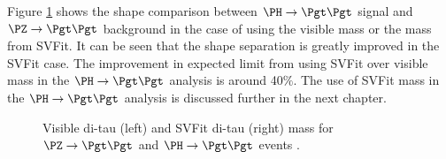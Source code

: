 Figure \ref{fig:svfit} shows the shape comparison between $\PH\to\Pgt\Pgt$ signal
and $\PZ \to \Pgt\Pgt$ background in the case of using the visible mass or the mass from SVFit. It can
be seen that the shape separation is greatly improved in the SVFit case.
The improvement in expected limit from using SVFit over visible mass in the $\PH
\to \Pgt\Pgt$ analysis is around 40$\%$. The use of SVFit mass in the
$\PH\to\Pgt\Pgt$ analysis is discussed further in the next chapter.

\begin{figure}[tbh]
\begin{center}
\end{center}
\caption[Di-tau mass for for $\ZToTauTau$ and $\HToTauTau$ events, reconstructed
using the visible products or the SVFit algorithm.]{Visible di-tau (left) and SVFit di-tau (right) mass for $\ZToTauTau$
and $\HToTauTau$ events \cite{HIG-13-004}.
} 
\label{fig:svfit}
\end{figure}


